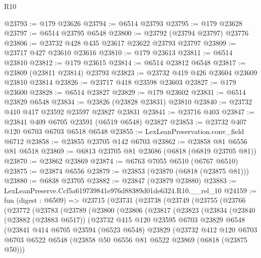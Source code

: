\begin{lexlean}{R10}
\begin{coremodule}
@23793 := @179 @23626
@23794 := @6514 @23793
@23795 := @179 @23628
@23797 := @6514 @23795 @6548
@23800 := @23792 (@23794 @23797) @23776
@23806 := @23732 @428 @435 @23617 @23622 @23793 @23797
@23809 := @23717 @427 @23610 @23616
@23810 := @179 @23613
@23811 := @6514 @23810
@23812 := @179 @23615
@23814 := @6514 @23812 @6548
@23817 := @23809 (@23811 @23814) @23793
@23823 := @23732 @419 @426 @23604 @23609 @23810 @23814
@23826 := @23717 @418 @23598 @23603
@23827 := @179 @23600
@23828 := @6514 @23827
@23829 := @179 @23602
@23831 := @6514 @23829 @6548
@23834 := @23826 (@23828 @23831) @23810
@23840 := @23732 @410 @417 @23592 @23597 @23827 @23831
@23841 := @23716 @403
@23847 := @23841 @409 @6705 @23591 (@6519 @6548) @23827
@23853 := @23732 @407 @120 @6703 @6703 @6518 @6548
@23855 := LexLeanPreservation.conv_field @6712
@23858 := @23855 @23705 @142 @6703
@23862 := @23858 @81 @6556 @81 @6518
@23869 := @6813 @23705 @81 @23686 (@6818 (@6819 @23705 @81))
@23870 := @23862 @23869
@23874 := @6763 @7055 @6510 (@6767 @6510)
@23875 := @23874 @6556
@23879 := @23853 (@23870 (@6818 (@23875 @81)))
@23880 := @6838 @23705
@23882 := @23847 (@23879 @23880)
@23883 := LexLeanPreserve.Ccf5a619739841e976d88389d01de6324.R10.__rel_10
@24159 := fun (digest : @6509) =>
  @23715
    (@23731
      (@23738
        (@23749
          (@23755
            (@23766
              (@23772
                (@23783
                  (@23789
                    (@23800
                      (@23806
                        (@23817
                          (@23823
                            (@23834
                              (@23840
                                (@23882 (@23883 @6517))
                                (@23732
                                  @415
                                  @120
                                  @23595
                                  @6703
                                  @23829
                                  @6548
                                  (@23841
                                    @414
                                    @6705
                                    @23594
                                    (@6523 @6548)
                                    @23829
                                    (@23732
                                      @412
                                      @120
                                      @6703
                                      @6703
                                      @6522
                                      @6548
                                      (@23858 @50 @6556 @81 @6522 @23869 (@6818 (@23875 @50)))

\end{coremodule}
\end{lexlean}
